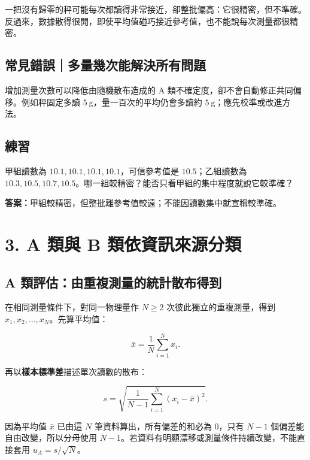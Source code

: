 \documentclass[11pt,a4paper]{article}
\begin{document}
一把沒有歸零的秤可能每次都讀得非常接近，卻整批偏高：它很精密，但不準確。反過來，數據散得很開，即使平均值碰巧接近參考值，也不能說每次測量都很精密。

\subsection{常見錯誤｜多量幾次能解決所有問題}\label{ux5e38ux898bux932fux8aa4ux591aux91cfux5e7eux6b21ux80fdux89e3ux6c7aux6240ux6709ux554fux984c}

增加測量次數可以降低由隨機散布造成的 A 類不確定度，卻不會自動修正共同偏移。例如秤固定多讀 \(5\ \mathrm{g}\)，量一百次的平均仍會多讀約 \(5\ \mathrm{g}\)；應先校準或改進方法。

\begin{HandoutSelfCheck}

\subsection{練習}\label{ux7df4ux7fd2-1}

甲組讀數為 \(10.1,10.1,10.1,10.1\)，可信參考值是 \(10.5\)；乙組讀數為 \(10.3,10.5,10.7,10.5\)。哪一組較精密？能否只看甲組的集中程度就說它較準確？

\textbf{答案：}甲組較精密，但整批離參考值較遠；不能因讀數集中就宣稱較準確。

\end{HandoutSelfCheck}

\section{3. A 類與 B 類依資訊來源分類}\label{a-ux985eux8207-b-ux985eux4f9dux8cc7ux8a0aux4f86ux6e90ux5206ux985e}

\subsection{A 類評估：由重複測量的統計散布得到}\label{a-ux985eux8a55ux4f30ux7531ux91cdux8907ux6e2cux91cfux7684ux7d71ux8a08ux6563ux5e03ux5f97ux5230}

在相同測量條件下，對同一物理量作 \(N\ge2\) 次彼此獨立的重複測量，得到 \(x_1,x_2,\ldots,x_N\)。先算平均值：

\[
\bar x=\frac{1}{N}\sum_{i=1}^{N}x_i.
\]

再以\textbf{樣本標準差}描述單次讀數的散布：

\[
s=\sqrt{\frac{1}{N-1}\sum_{i=1}^{N}(x_i-\bar x)^2}.
\]

因為平均值 \(\bar x\) 已由這 \(N\) 筆資料算出，所有偏差的和必為 \(0\)，只有 \(N-1\) 個偏差能自由改變，所以分母使用 \(N-1\)。若資料有明顯漂移或測量條件持續改變，不能直接套用 \(u_A=s/\sqrt N\)。
\end{document}
